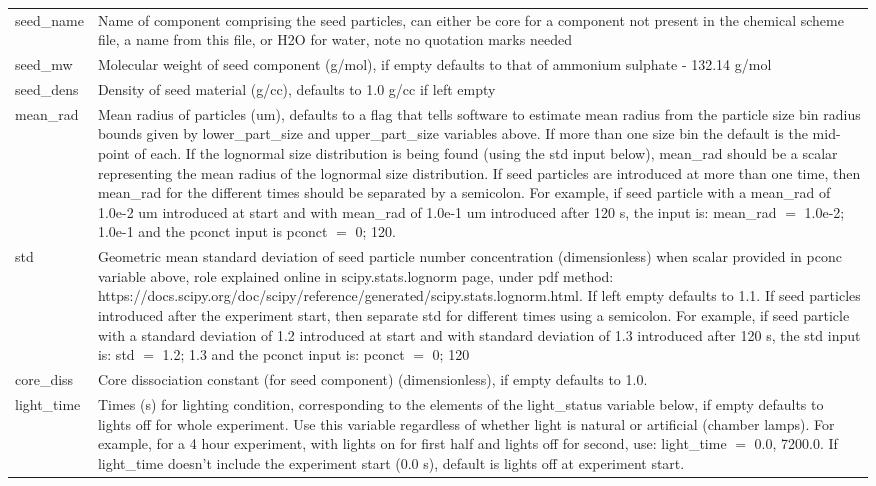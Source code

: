 \documentclass[gmd, manuscript]{copernicus}
\begin{document}
\begin{center}
\begin{supertabular}{p{0.15\textwidth}p{0.75\textwidth}}
seed\_name & Name of component comprising the seed particles, can either be core for a component not present in the chemical scheme file, a name from this file, or H2O for water, note no quotation marks needed\\	

seed\_mw & Molecular weight of seed component (g/mol), if empty defaults to that of ammonium sulphate - 132.14 g/mol\\

seed\_dens & Density of seed material (g/cc), defaults to 1.0 g/cc if left empty \\	

mean\_rad & Mean radius of particles (um), defaults to a flag that tells software to estimate mean radius from the particle size bin radius bounds given by lower\_part\_size and upper\_part\_size variables above.  If more than one size bin the default is the mid-point of each.  If the lognormal size distribution is being found (using the std input below), mean\_rad should be a scalar representing the mean radius of the lognormal size distribution.  If seed particles are introduced at more than one time, then mean\_rad for the different times should be separated by a semicolon.  For example, if seed particle with a mean\_rad of 1.0e-2 um introduced at start and with mean\_rad of 1.0e-1 um introduced after 120 s, the input is: mean\_rad $=$ 1.0e-2; 1.0e-1 and the pconct input is pconct $=$ 0; 120.\\

std & Geometric mean standard deviation of seed particle number concentration (dimensionless) when scalar provided in pconc variable above, role explained online in scipy.stats.lognorm page, under pdf method: https://docs.scipy.org/doc/scipy/reference/generated/scipy.stats.lognorm.html.  If left empty defaults to 1.1.  If seed particles introduced after the experiment start, then separate std for different times using a semicolon.  For example, if seed particle with a standard deviation of 1.2 introduced at start and with standard deviation of 1.3 introduced after 120 s, the std input is: std $=$ 1.2; 1.3 and the pconct input is: pconct $=$ 0; 120\\

core\_diss & Core dissociation constant (for seed component) (dimensionless), if empty defaults to 1.0.\\

light\_time & Times (s) for lighting condition, corresponding to the elements of the light\_status variable below, if empty defaults to lights off for whole experiment.  Use this variable regardless of whether light is natural or artificial (chamber lamps).  For example, for a 4 hour experiment, with lights on for first half and lights off for second, use: light\_time $=$ 0.0, 7200.0. If light\_time doesn't include the experiment start (0.0 s), default is lights off at experiment start.\\


\end{supertabular}
\end{center}
\end{document}
